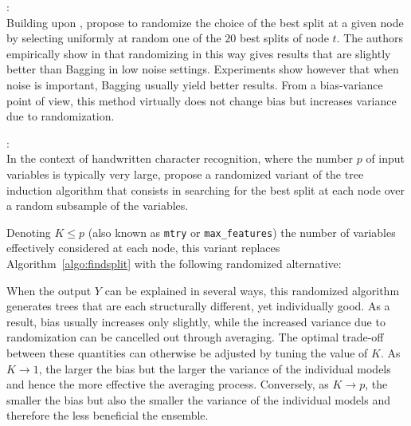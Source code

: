 \begin{description}
\item \citet{dietterich:1995}: \hfill \\
    Building upon \citep{kwok:1990}, \citet{dietterich:1995} propose
    to randomize the choice of the best split at a given node by selecting
    uniformly at random one of the $20$ best splits of node $t$. The authors empirically
    show in \citep{dietterich:1995,dietterich:2000} that randomizing in this
    way gives results that are slightly better than Bagging in low noise settings.
    Experiments show however that when noise is important, Bagging usually
    yield better results. From a bias-variance point of view, this method
    virtually does not change bias but increases variance due to randomization.

\item \citet{amit:1997}: \hfill \\
    In the context of handwritten character recognition, where the number $p$
    of input variables is typically very large, \citet{amit:1997} propose a
    randomized variant of the tree induction algorithm that consists in
    searching for the best split at each node over a random subsample of the
    variables.

    Denoting $K \leq p$ (also known as \texttt{mtry} or
    \texttt{max\_features}) the number of variables effectively considered at
    each node, this variant replaces Algorithm~\ref{algo:findsplit}
    with the following randomized alternative:
    When the output $Y$ can be explained in several ways, this randomized
    algorithm generates trees that are each structurally different, yet
    individually good. As a result, bias usually increases only slightly, while
    the increased variance due to randomization can be cancelled out through averaging. The
    optimal trade-off between these quantities can otherwise be adjusted by
    tuning the value of $K$. As $K \to 1$, the larger the bias but the larger the
    variance of the individual models and hence the more effective the
    averaging process. Conversely, as $K \to p$, the smaller the bias but also the
    smaller the variance of the individual models and therefore the less
    beneficial the ensemble.


\end{description}
